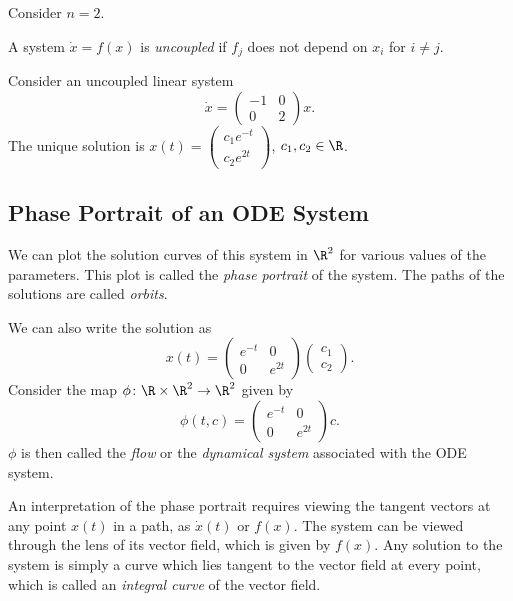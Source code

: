 Consider $n = 2$.
\begin{definition} \label{def:linear:uncoupled_system}
    A system $\dot{x} = f(x)$ is \emph{uncoupled} if $f_j$ does not depend on
    $x_i$ for $i \neq j$.
\end{definition}
Consider an uncoupled linear system \[
    \dot{x} = \begin{pmatrix}
        -1 & 0 \\
        0 & 2
    \end{pmatrix} x.
\] The unique solution is $x(t) = \begin{pmatrix}
    c_1 e^{-t} \\
    c_2 e^{2t}
\end{pmatrix}$, $c_1, c_2 \in \R$.

\subsection*{Phase Portrait of an ODE System} \label{sec:phase_portrait}
We can plot the solution curves of this system in $\R^2$ for various values of
the parameters.
This plot is called the \emph{phase portrait} of the system.
The paths of the solutions are called \emph{orbits}.

We can also write the solution as \[
    x(t) = \begin{pmatrix}
        e^{-t} & 0 \\
        0 & e^{2t}
    \end{pmatrix} \begin{pmatrix}
        c_1 \\
        c_2
    \end{pmatrix}.
\] Consider the map $\phi \colon \R \times \R^2 \to \R^2$ given by \[
    \phi(t, c) = \begin{pmatrix}
        e^{-t} & 0 \\
        0 & e^{2t}
    \end{pmatrix} c.
\] $\phi$ is then called the \emph{flow} or the \emph{dynamical system}
associated with the ODE system.

An interpretation of the phase portrait requires viewing the tangent vectors at
any point $x(t)$ in a path, as $\dot{x}(t)$ or $f(x)$.
The system can be viewed through the lens of its vector field, which is given by
$f(x)$.
Any solution to the system is simply a curve which lies tangent to the vector
field at every point, which is called an \emph{integral curve} of the vector
field.
